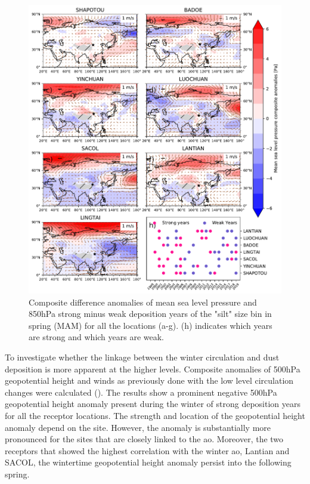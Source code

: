 \begin{figure}[htbp]
    \centering
    \includegraphics[width=\textwidth]{texfiles/figs/mslp_850hPa_20micron_MAM.pdf}
    \caption{Composite difference anomalies of mean sea level pressure and 850hPa strong minus weak deposition years of the "silt" size bin in spring (MAM) for all the locations (a-g).  (h) indicates which years are strong and which years are weak.}
    \label{fig:MAM_850_coarse_composite}
\end{figure}

To investigate whether the linkage between the winter circulation and dust deposition is more apparent at the higher levels.
Composite anomalies of 500hPa geopotential height and winds as previously done with the low level circulation changes were calculated ().
The results show a prominent negative 500hPa geopotential height anomaly present during the winter of strong deposition years for all the receptor locations. 
The strength and location of the geopotential height anomaly depend on the site. However, the anomaly is substantially more pronounced for the sites that are closely linked to the \acrshort{ao}. Moreover, the two receptors that showed the highest correlation with the winter \acrshort{ao}, Lantian and SACOL, the wintertime geopotential height anomaly persist into the following spring.      


